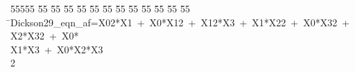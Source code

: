 %
%
\begin{tabbing}
55555 \= 55 \= 55 \= 55 \= 55 \= 55 \= 55 \= 55 \= 55 \= 55 \= 55 \= 55 \= 55 \= \>Dickson29\_eqn\_af=X02*X1\ +\ X0*X12\ +\ X12*X3\ +\ X1*X22\ +\ X0*X32\ +\ X2*X32\ +\ X0*\\[0pt]
\>X1*X3\ +\ X0*X2*X3\\[0pt]
2\>\end{tabbing}
